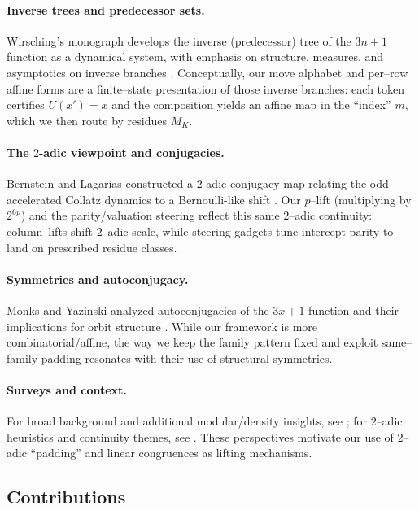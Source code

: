 \documentclass[11pt,letterpaper]{amsart}
\theoremstyle{definition}
\theoremstyle{plain}
\theoremstyle{plain}
\theoremstyle{remark}
\begin{document}
\paragraph{Inverse trees and predecessor sets.}
Wirsching’s monograph develops the inverse (predecessor) tree of the $3n{+}1$ function as a dynamical system, with emphasis on structure, measures, and asymptotics on inverse branches \cite{Wirsching1998LNM}. Conceptually, our move alphabet and per–row affine forms are a finite–state presentation of those inverse branches: each token certifies $U(x')=x$ and the composition yields an affine map in the “index” $m$, which we then route by residues $M_K$.

\paragraph{The $2$-adic viewpoint and conjugacies.}
Bernstein and Lagarias constructed a $2$-adic conjugacy map relating the odd–accelerated Collatz dynamics to a Bernoulli-like shift \cite{BernsteinLagarias1996}. Our $p$–lift (multiplying by $2^{6p}$) and the parity/valuation steering reflect this same $2$–adic continuity: column–lifts shift $2$–adic scale, while steering gadgets tune intercept parity to land on prescribed residue classes.

\paragraph{Symmetries and autoconjugacy.}
Monks and Yazinski analyzed autoconjugacies of the $3x{+}1$ function and their implications for orbit structure \cite{MonksYazinski2004}. While our framework is more combinatorial/affine, the way we keep the family pattern fixed and exploit same–family padding resonates with their use of structural symmetries.

\paragraph{Surveys and context.}
For broad background and additional modular/density insights, see \cite{Lagarias2010survey,Terras1976,Terras1979}; for $2$–adic heuristics and continuity themes, see \cite{Gouvea1997,Nathanson1996}. These perspectives motivate our use of $2$–adic “padding” and linear congruences as lifting mechanisms.

\subsection{Contributions}
\end{document}
